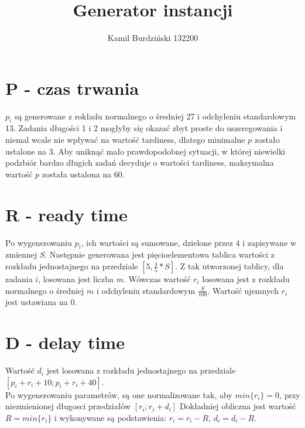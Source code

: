 \documentclass[12pt]{article}
\title{Generator instancji}
\author{Kamil Burdziński 132200}
\date{}
\begin{document}
\maketitle

\section{P - czas trwania}
$p_i$ są generowane z rokładu normalnego o średniej 27 i odchyleniu standardowym 13. Zadania długości 1 i 2
mogłyby się okazać zbyt proste do uszeregowania i niemal wcale nie wpływać na wartość tardiness, dlatego
minimalne $p$ zostało ustalone na 3. Aby uniknąć mało prawdopodobnej sytuacji, w której niewielki podzbiór bardzo
długich zadań decyduje o wartości tardiness, maksymalna wartość $p$ została ustalona na 60.

\section{R - ready time}
Po wygenerowaniu $p_i$, ich wartości są sumowane, dzielone przez $4$ i zapisywane w zmiennej $S$.
Następnie generowana jest pięcioelementowa tablica wartości z rozkładu jednostajnego
na przedziale $[5, \tfrac{4}{5}*S]$. Z tak utworzonej tablicy, dla zadania $i$,
losowana jest liczba $m$. Wówczas wartość $r_i$ losowana jest z rozkładu normalnego 
o średniej $m$ i odchyleniu standardowym $\tfrac{S}{100}$. Wartość ujemnych $r_i$ jest 
ustawiana na $0$.
\section{D - delay time}
Wartość $d_i$ jest losowana z rozkładu jednostajnego na przedziale 
$[p_i+r_i+10; p_i+r_i+40]$. \\

Po wygenerowaniu parametrów, są one normalizowane tak, aby $min\{r_i\}=0$, przy niezmienionej
długosci przedziałów $[r_i; r_i+d_i]$
Dokładniej obliczna jest wartość $R = min\{r_i\}$ i wykonywane są podstawienia:
$r_i = r_i - R$, $d_i = d_i - R$.
\end{document}
